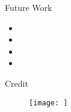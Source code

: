 \documentclass[uncompress,aspectratio=43]{beamer}  %
\begin{document}
\begin{frame}{Future Work}
    
    \begin{itemize}
    \item 
      \item
      \item
        \item

    \end{itemize}
    
  \end{frame}

\begin{frame}{Credit}
    \begin{figure}
      \begin{center}
        \texttt{[image: ]}
      \end{center}
    \end{figure}
    \end{frame}
\end{document}
